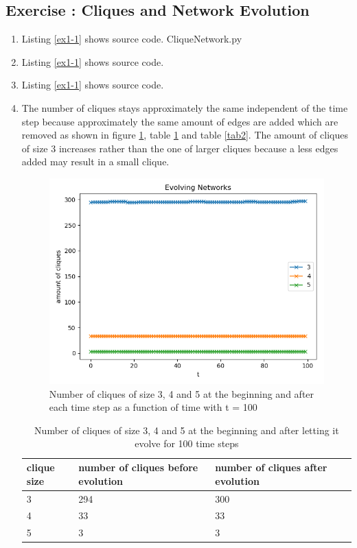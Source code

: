 \documentclass[10pt,a4paper]{article}
\newcommand{\exercise}[1]
{
  \stepcounter{subsection}
  \subsection*{Exercise \thesubsection: #1}

}
\begin{document}
\exercise{Cliques and Network Evolution}
\begin{enumerate}
\item Listing \ref{ex1-1} shows source code.
 {CliqueNetwork.py}

\item Listing \ref{ex1-1} shows source code.

\item Listing \ref{ex1-1} shows source code.

\item The number of cliques stays approximately the same independent of the time step because approximately the same amount of edges are added which are removed as shown in figure \ref{fig-1}, table \ref{tab1} and table \ref{tab2}. The amount of cliques of size 3 increases rather than the one of larger cliques because a less edges added may result in a small clique.
\begin{figure}
\includegraphics[scale=1]{plotTask1_100.png}
\caption{Number of cliques of size 3, 4 and 5 at the beginning and after each time step as a function of time with t = 100}
\label{fig-1}
\end{figure}

\begin{table}[!h]
\label{tab1}
\begin{tabular}{llll}
clique size & number of cliques before evolution & number of cliques after evolution\\
\hline
3 & 294 & 300\\
4 & 33 & 33\\
5 & 3 & 3\\
\end{tabular}
\caption{Number of cliques of size 3, 4 and 5 at the beginning and after letting it evolve for 100 time steps}
\end{table}


\end{enumerate}
\end{document}
